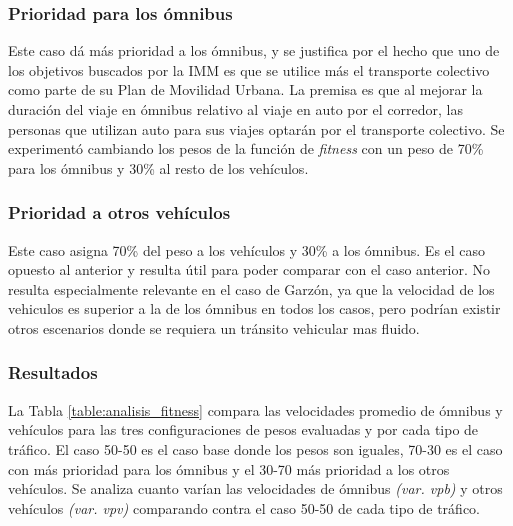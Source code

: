 \subsubsection{Prioridad para los ómnibus}
Este caso dá más prioridad a los ómnibus, y se justifica por el hecho que uno de los objetivos buscados por la IMM es que se utilice más el transporte colectivo como parte de su Plan de Movilidad Urbana. La premisa es que al mejorar la duración del viaje en ómnibus relativo al viaje en auto por el corredor, las personas que utilizan auto para sus viajes optarán por el transporte colectivo. Se experimentó cambiando los pesos de la función de \emph{fitness} con un peso de 70\% para los ómnibus y 30\% al resto de los vehículos.


\subsubsection{Prioridad a otros vehículos}

Este caso asigna 70\% del peso a los vehículos y 30\% a los ómnibus. Es el caso opuesto al anterior y resulta útil para poder comparar con el caso anterior. No resulta especialmente relevante en el caso de Garzón, ya que la velocidad de los vehiculos es superior a la de los ómnibus en todos los casos, pero podrían existir otros escenarios donde se requiera un tránsito vehicular mas fluido.

\subsubsection{Resultados}

La Tabla \ref{table:analisis_fitness} compara las velocidades promedio de ómnibus y vehículos para las tres configuraciones de pesos evaluadas y por cada tipo de tráfico.  El caso 50-50 es el caso base donde los pesos son iguales, 70-30 es el caso con más prioridad para los ómnibus y el 30-70 más prioridad a los otros vehículos. Se analiza cuanto varían las velocidades de ómnibus \emph{(var. vpb)} y otros vehículos \emph{(var. vpv)} comparando contra el caso 50-50 de cada tipo de tráfico.


